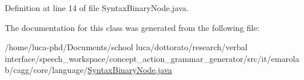 Definition at line 14 of file Syntax\-Binary\-Node.\-java.



The documentation for this class was generated from the following file\-:\begin{DoxyCompactItemize}
\item 
/home/luca-\/phd/\-Documents/school luca/dottorato/research/verbal interface/speech\-\_\-workspace/concept\-\_\-action\-\_\-grammar\-\_\-generator/src/it/emarolab/cagg/core/language/\hyperlink{SyntaxBinaryNode_8java}{Syntax\-Binary\-Node.\-java}\end{DoxyCompactItemize}
